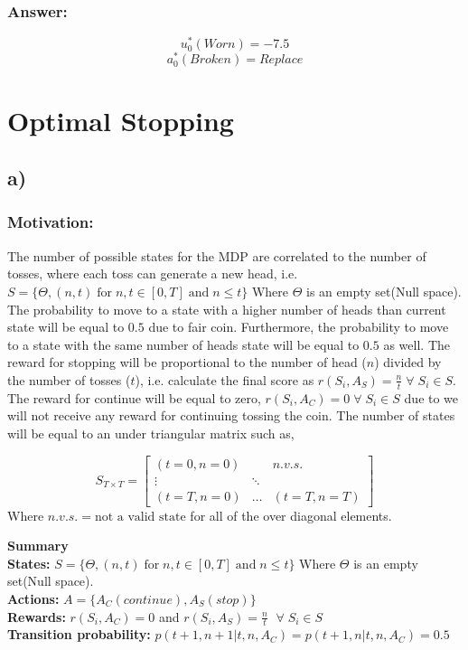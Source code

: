 \documentclass{article}
\begin{document}
\subsubsection*{Answer:}
$$u^*_0(Worn)= -7.5$$
$$a^*_0(Broken)=Replace$$


\section{Optimal Stopping}
\subsection*{a)}
\subsubsection*{Motivation:}
The number of possible states for the MDP are correlated to the number of tosses, where each toss can generate a new head, i.e. $S = \{\Theta ,(n, t) \; \text{for} \; n,t\in [0,T] \; \text{and} \; n\leq t\}$ Where $\Theta$ is an empty set(Null space). The probability to move to a state with a higher number of heads than current state will be equal to $0.5$ due to fair coin. Furthermore, the probability to move to a state with the same number of heads state will be equal to $0.5$ as well. The reward for stopping will be proportional to the number of head ($n$) divided by the number of tosses ($t$), i.e. calculate the final score as $r(S_i, A_S) = \frac{n}{t} \; \forall \; S_i \in S$. The reward for continue will be equal to zero, $r(S_i, A_C) = 0 \; \forall \; S_i \in S $ due to we will not receive any reward for continuing tossing the coin. The number of states will be equal to an under triangular matrix such as, 

\[
S_{T\times T} = \begin{bmatrix} 
    (t=0, n=0) &  & n.v.s. \\
    \vdots & \ddots & \\
    (t=T, n=0) & \dots& (t=T, n=T) 
    \end{bmatrix}
\]
Where  $n.v.s. =\text{not a valid state}$ for all of the over diagonal elements.

\textbf{Summary}\\
\textbf{States:} $S = \{\Theta ,(n, t) \; \text{for} \; n,t\in [0,T] \; \text{and} \; n\leq t\}$ Where $\Theta$ is an empty set(Null space).\\
\textbf{Actions:} $A = \{A_C(continue), A_S(stop)\}$ \\
\textbf{Rewards:}  $r(S_i, A_C) = 0$ and $r(S_i, A_S) = \frac{n}{t}$ $ \; \forall \; S_i \in S$  \\
\textbf{Transition probability:} $p(t+1, n+1|t, n, A_C)=p(t+1, n|t, n, A_C)=0.5$
\end{document}
